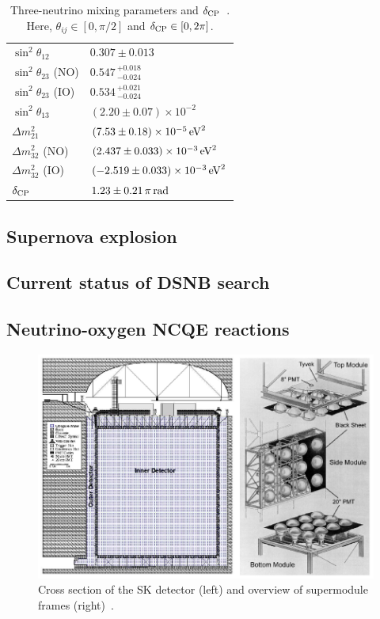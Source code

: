 \begin{table}[h]
	\caption[Three-neutrino mixing parameters and $\delta_{{\rm CP}}$]{\label{Introd_Tab:Neu} Three-neutrino mixing parameters and $\delta_{{\rm CP}}$~\cite{PDG}. Here, $\theta_{ij}\in[0,\pi/2]$ and $\delta_{{\rm CP}}\in[0,2\pi]$.}
	\centering
	\vs
	\begin{tabular}{ll}
		\hline\hline
		$\sin^{2}\theta_{12}$&$0.307 \pm 0.013$\\
		$\sin^{2}\theta_{23}$ (NO)&$0.547\,^{+0.018}_{-0.024}$\\
		$\sin^{2}\theta_{23}$ (IO)&$0.534\,^{+0.021}_{-0.024}$\\
		$\sin^{2}\theta_{13}$&$(2.20 \pm 0.07) \times 10^{-2}$\\
		$\Delta m_{21}^{2}$&$(7.53 \pm 0.18) \times 10^{-5}\,{\rm eV}^{2}$\\
		$\Delta m_{32}^{2}$ (NO)&$(2.437 \pm 0.033) \times 10^{-3}\,{\rm eV}^{2}$\\
		$\Delta m_{32}^{2}$ (IO)&$(-2.519 \pm 0.033) \times 10^{-3}\,{\rm eV}^{2}$\\
		$\delta_{{\rm CP}}$&$1.23 \pm 0.21\,\pi\,{\rm rad}$\\
		\hline\hline
	\end{tabular}
\end{table}

\subsection{Supernova explosion}

\subsection{Current status of DSNB search}

\subsection{Neutrino-oxygen NCQE reactions}

\begin{figure}[tbp]
	\centering
	\includegraphics[width=14cm]{Figures/SK/SK_SM}
	\caption[Cross section of the SK detector and overview of supermodule frames]{\label{SK_SK_SM} Cross section of the SK detector (left) and overview of supermodule frames (right)~\cite{2003Fukuda}.}
\end{figure}

\newpage
